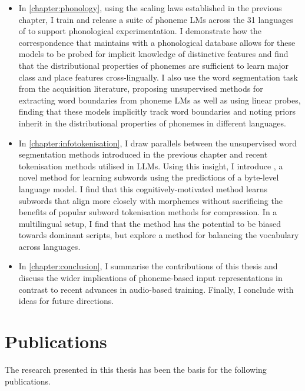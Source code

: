 \begin{itemize}
    \item In \cref{chapter:phonology}, using the scaling laws established in the previous chapter, I train and release a suite of phoneme LMs across the 31 languages of \ipachildes to support phonological experimentation. I demonstrate how the correspondence that \gpp maintains with a phonological database allows for these models to be probed for implicit knowledge of distinctive features and find that the distributional properties of phonemes are sufficient to learn major class and place features cross-lingually. I also use the word segmentation task from the acquisition literature, proposing unsupervised methods for extracting word boundaries from phoneme LMs as well as using linear probes, finding that these models implicitly track word boundaries and noting priors inherit in the distributional properties of phonemes in different languages.
    \item In \cref{chapter:infotokenisation}, I draw parallels between the unsupervised word segmentation methods introduced in the previous chapter and recent tokenisation methods utilised in LLMs. Using this insight, I introduce \bytespan, a novel method for learning subwords using the predictions of a byte-level language model. I find that this cognitively-motivated method learns subwords that align more closely with morphemes without sacrificing the benefits of popular subword tokenisation methods for compression. In a multilingual setup, I find that the method has the potential to be biased towards dominant scripts, but explore a method for balancing the vocabulary across languages. 
    \item In \cref{chapter:conclusion}, I summarise the contributions of this thesis and discuss the wider implications of phoneme-based input representations in contrast to recent advances in audio-based training. Finally, I conclude with ideas for future directions.
\end{itemize}

\section{Publications}

The research presented in this thesis has been the basis for the following publications.

